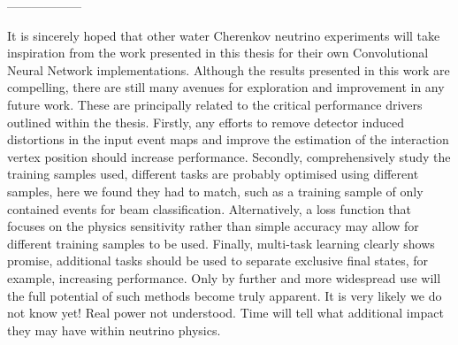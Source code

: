------------------

It is sincerely hoped that other water Cherenkov neutrino experiments will take inspiration from
the work presented in this thesis for their own Convolutional Neural Network implementations.
Although the results presented in this work are compelling, there are still many avenues for
exploration and improvement in any future work. These are principally related to the critical
performance drivers outlined within the thesis. Firstly, any efforts to remove detector induced
distortions in the input event maps and improve the estimation of the interaction vertex position
should increase performance. Secondly, comprehensively study the training samples used, different
tasks are probably optimised using different samples, here we found they had to match, such as a
training sample of only contained events for beam classification. Alternatively, a loss function
that focuses on the physics sensitivity rather than simple accuracy may allow for different
training samples to be used. Finally, multi-task learning clearly shows promise, additional tasks
should be used to separate exclusive final states, for example, increasing performance. Only by
further and more widespread use will the full potential of such methods become truly apparent. It
is very likely we do not know yet! Real power not understood. Time will tell what additional
impact they may have within neutrino physics.